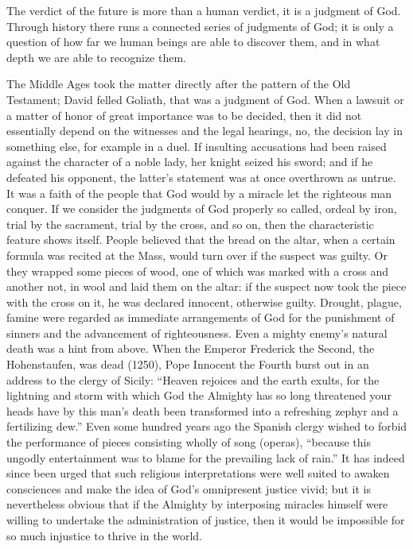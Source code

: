 \documentclass[12pt,a4paper,openany]{book}
\newcommand{\opage}[1]{\marginnote{\footnotesize\textit{[#1]}}}
\begin{document}
The verdict of the future is more than a human verdict,
it is a judgment of God. Through history there runs a
connected series of judgments of God; it is only a question
of how far we human beings are able to
discover them, and in what depth we are able to recognize %
them.

The Middle Ages took the matter directly after the pattern of the Old
Testament; David felled Goliath, that was
a judgment of God. When a lawsuit or a matter of honor of
great importance was to be decided, then it did not essentially depend
on the witnesses and the legal hearings, no, the decision
lay in something else, for example in a duel. If
insulting accusations had been raised against the character of a noble
lady, her knight seized his sword; and
if he defeated his opponent, the latter's statement
was at once overthrown as untrue. It was a faith of the people
that God would by a miracle let the righteous man conquer.
If we consider the judgments of God properly so called, ordeal by iron,
trial by the sacrament, trial by the cross, and so on, then the
characteristic feature shows itself. People believed that the bread on the altar,
when a certain formula was recited at the Mass, would
turn over if the suspect was guilty. Or
they wrapped some pieces of wood, one of which was
marked with a cross and another not, in wool and laid
them on the altar: if the suspect now took the
piece with the cross on it, he was declared innocent,
otherwise guilty. Drought, plague, famine
were regarded as immediate arrangements of
\setcounter{footnote}{0}%
\opage{88}God for the punishment of sinners and the advancement of righteousness.
Even a mighty enemy's natural death was a hint
from above. When the Emperor Frederick the Second, the Hohenstaufen,
was dead (1250), Pope Innocent the Fourth burst out in an
address to the clergy of Sicily: ``Heaven rejoices
and the earth exults, for the lightning and storm with which
God the Almighty has so long threatened your heads
have by this man's death been transformed into
a refreshing zephyr and a fertilizing dew.'' Even
some hundred years ago the Spanish
clergy wished to forbid the performance of pieces consisting wholly of
song (operas), ``because this ungodly entertainment
was to blame for the prevailing lack of rain.'' It has
indeed since been urged that such religious interpretations
were well suited to awaken consciences
and make the idea of God's omnipresent
justice vivid; but it is nevertheless obvious that
if the Almighty by interposing miracles himself
were willing to undertake the administration of justice, then it would be
impossible for so much injustice to thrive in
the world.
\end{document}
